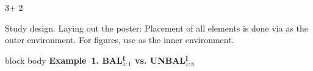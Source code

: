 \documentclass{beamer}
\begin{document}
\begin{frame}[t]
\begin{textblock*}{3\colwidth + 2\colsep}
\begin{alertblock}{%
	\begin{minipage}[b]{60pt}
		\RaggedRight
		\noindent\hspace{-10pt}
	\end{minipage}%
	\begin{minipage}[b]{3\colwidth+2\colsep-125pt}\strut%
		Study design.\;
		{\mdseries Laying out the poster: Placement of all elements is done via  as the outer environment. For figures, use  as the inner environment.}
	\end{minipage}%
}
	\vspace{-0.25cm}
	\begin{minipage}{0.49\textwidth}
		\begin{beamercolorbox}[ht = 23.5cm, wd = \linewidth, left]{block body}
			\centering\textbf{\boldmath Example~1.\; BAL$^{\mathbfup{I}}_{1{:}1}$ vs. UNBAL$^{\mathbfup{I}}_{1{:}8}$}\par
			\vspace{15pt}
			\raggedright\hspace*{100pt}%
			\color{CMYKGray}\par
			\vspace{-10.25cm}
			\raggedleft%
			\color{CMYKGray}%

\end{beamercolorbox}
\end{minipage}
\end{alertblock}
\end{textblock*}
\end{frame}
\end{document}
